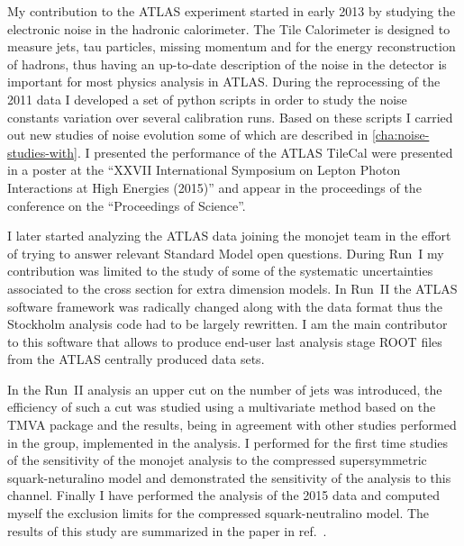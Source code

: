 My contribution to the ATLAS experiment started in early 2013 by studying the
electronic noise in the hadronic calorimeter. The Tile Calorimeter is designed
to measure jets, tau particles, missing momentum and for the energy
reconstruction of hadrons, thus having an up-to-date description of the noise
in the detector is important for most physics analysis in ATLAS\@. During the
reprocessing of the 2011 data I developed a set of python scripts in order to
study the noise constants variation over several calibration runs. Based on
these scripts I carried out new studies of noise evolution some of which are
described in \cref{cha:noise-studies-with}. I presented the performance of the
ATLAS TileCal were presented in a poster at the ``XXVII International Symposium
on Lepton Photon Interactions at High Energies (2015)'' and appear in the
proceedings of the conference on the ``Proceedings of Science''.

I later started analyzing the ATLAS data joining the monojet team in the effort
of trying to answer relevant Standard Model open questions. During Run~I my
contribution was limited to the study of some of the systematic uncertainties
associated to the cross section for extra dimension models. In Run~II the ATLAS
software framework was radically changed along with the data format thus the
Stockholm analysis code had to be largely rewritten. I am the main contributor
to this software that allows to produce end-user last analysis stage ROOT files
from the ATLAS centrally produced data sets.

In the Run~II analysis an upper cut on the number of jets was introduced, the
efficiency of such a cut was studied using a multivariate method based on the
TMVA package and the results, being in agreement with other studies performed in
the group, implemented in the analysis. I performed for the first time studies
of the sensitivity of the monojet analysis to the compressed supersymmetric
squark-neturalino model and demonstrated the sensitivity of the analysis to
this channel. Finally I have performed the analysis of the 2015 data and
computed myself the exclusion limits for the compressed squark-neutralino
model. The results of this study are summarized in the paper in
ref.~\cite{MonoJetPaper}.
